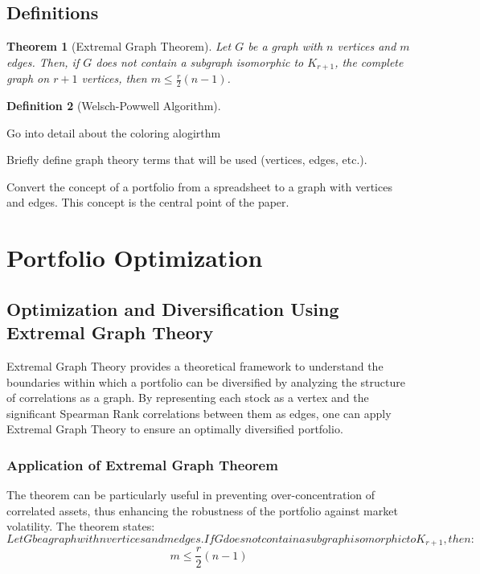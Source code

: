 \documentclass{article}
\newtheorem{theorem}{Theorem}[section]
\newtheorem{definition}[theorem]{Definition}
\begin{document}
\subsection{Definitions}



\begin{theorem}[Extremal Graph Theorem]
    Let $G$ be a graph with $n$ vertices and $m$ edges. Then, if $G$ does not contain a subgraph isomorphic to $K_{r+1}$, the complete graph on $r+1$ vertices, then $m \leq \frac{r}{2}(n-1)$.
\end{theorem}



\begin{definition}[Welsch-Powwell Algorithm]
\end{definition}

Go into detail about the coloring alogirthm



Briefly define graph theory terms that will be used (vertices, edges, etc.). 


Convert the concept of a portfolio from a spreadsheet to a graph with vertices and edges. This concept is the central point of the paper.



\section{Portfolio Optimization}

\subsection{Optimization and Diversification Using Extremal Graph Theory}

Extremal Graph Theory provides a theoretical framework to understand the boundaries within which a portfolio can be diversified by analyzing the structure of correlations as a graph. By representing each stock as a vertex and the significant Spearman Rank correlations between them as edges, one can apply Extremal Graph Theory to ensure an optimally diversified portfolio.

\subsubsection{Application of Extremal Graph Theorem}

The theorem can be particularly useful in preventing over-concentration of correlated assets, thus enhancing the robustness of the portfolio against market volatility. The theorem states:
\[
{Let } G { be a graph with } n { vertices and } m { edges. If } G { does not contain a subgraph isomorphic to } K_{r+1}, { then: }
\]
\[
m \leq \frac{r}{2} (n-1)
\]
\end{document}
